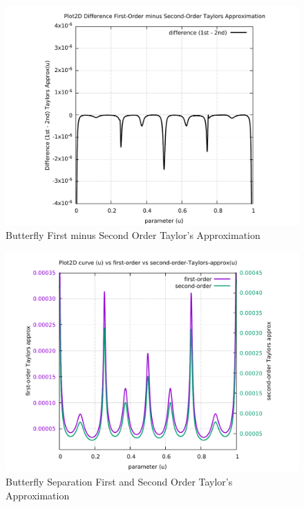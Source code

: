 \begin{figure}
	\caption     {Butterfly First minus Second Order Taylor's Approximation}
	\label{06-img-Butterfly-First-minus-Second-Order-Taylors-Approx.pdf}
	\includegraphics[width=1.00\textwidth]{Chap4/appendix/app-Butterfly/plots/06-img-Butterfly-First-minus-Second-Order-Taylors-Approx.pdf}
\end{figure}

\clearpage
\pagebreak

\begin{figure}
	\caption     {Butterfly Separation First and Second Order Taylor's Approximation}
	\label{07-img-Butterfly-Separation-First-and-Second-Order-Taylors-Approx.pdf}
\includegraphics[width=1.00\textwidth]{Chap4/appendix/app-Butterfly/plots/07-img-Butterfly-Separation-First-and-Second-Order-Taylors-Approx.pdf}
\end{figure}


